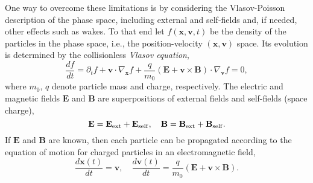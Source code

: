 One way to overcome these limitations is by considering the
Vlasov-Poisson description of the phase space, including external and
self-fields and, if needed, other effects such as wakes.  To that end
let $f(\mathbf{x},\mathbf{v},t)$ be the density of the particles in the
phase space, i.e., the position-velocity $(\mathbf{x}, \mathbf{v})$
space.  Its evolution is determined by the collisionless \emph{Vlasov
  equation},
\begin{equation}\label{eq:Vlasov}
  \frac{df}{dt}=\partial_t f + \mathbf{v} \cdot \nabla_{\mathbf{x}} f
  +\frac{q}{m_0}(\mathbf{E}+ \mathbf{v}\times\mathbf{B})\cdot
  \nabla_{\mathbf{v}} f  =  0,
\end{equation}
where $m_0$, $q$ denote particle mass and charge, respectively.  The
electric and magnetic fields $\mathbf{E}$ and $\mathbf{B}$ are
superpositions of external fields and self-fields (space charge),
\begin{equation}\label{eq:allfield}
    \mathbf{E} =
    \mathbf{E_{\RM{ext}}} + \mathbf{E_{\RM{self}}}, \quad
    \mathbf{B} =
    \mathbf{B_{\RM{ext}}} + \mathbf{B_{\RM{self}}}.
\end{equation}
If $\mathbf{E}$ and $\mathbf{B}$ are known, then each particle can be
propagated according to the equation of motion for charged particles in an
electromagnetic field,
\begin{equation*}\label{eq:motion}
  \frac{d\mathbf{x}(t)}{dt}  = \mathbf{v},
  \quad
  \frac{d\mathbf{v}(t)}{dt}  = \frac{q}{m_0}\left(\mathbf{E} +
    \mathbf{v}\times \mathbf{B}\right).
\end{equation*}

